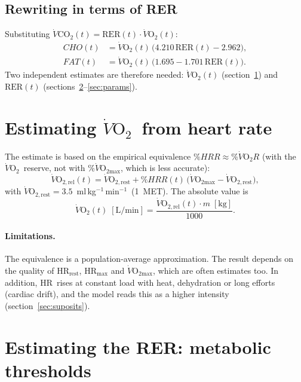 \documentclass[10pt,a4paper]{article}
\newcommand{\VO}{\ensuremath{\dot V\mathrm{O_2}}}
\newcommand{\VCO}{\ensuremath{\dot V\mathrm{CO_2}}}
\newcommand{\VOmax}{\ensuremath{\dot V\mathrm{O_{2max}}}}
\newcommand{\RER}{\ensuremath{\mathrm{RER}}}
\newcommand{\FC}{\ensuremath{\mathrm{HR}}}
\newcommand{\mlkgmin}{ml\,kg$^{-1}$\,min$^{-1}$}
\begin{document}
\subsection{Rewriting in terms of RER}
Substituting $\VCO(t)=\RER(t)\cdot\VO(t)$:
\begin{align}
  CHO(t) &= \VO(t)\,\bigl(4.210\,\RER(t)-2.962\bigr), \label{eq:cho-rer}\\
  FAT(t) &= \VO(t)\,\bigl(1.695-1.701\,\RER(t)\bigr). \label{eq:fat-rer}
\end{align}
Two independent estimates are therefore needed: \VO$(t)$ (section~\ref{sec:vo2}) and
$\RER(t)$ (sections~\ref{sec:rer}--\ref{sec:params}).

\section{Estimating \VO\ from heart rate}\label{sec:vo2}

The estimate is based on the empirical equivalence $\%HRR\approx\%\dot V\mathrm{O_2}R$
\citep{swain1997} (with the \VO\ reserve, not with \%\VOmax, which is less accurate):
\begin{equation}
  \dot V\mathrm{O_{2,rel}}(t)=\dot V\mathrm{O_{2,rest}}
  +\%HRR(t)\,\bigl(\VOmax-\dot V\mathrm{O_{2,rest}}\bigr),
\end{equation}
with $\dot V\mathrm{O_{2,rest}}=3.5$~\mlkgmin\ (1~MET). The absolute value is
\begin{equation}
  \VO(t)\;[\mathrm{L/min}]=\frac{\dot V\mathrm{O_{2,rel}}(t)\cdot m\;[\mathrm{kg}]}{1000}.
\end{equation}

\paragraph{Limitations.} The equivalence is a population-average approximation. The result
depends on the quality of $\FC_{\mathrm{rest}}$, $\FC_{\mathrm{max}}$ and \VOmax, which are
often estimates too. In addition, \FC\ rises at constant load with heat, dehydration or long
efforts (cardiac drift), and the model reads this as a higher intensity
(section~\ref{sec:suposits}).

\section{Estimating the RER: metabolic thresholds}\label{sec:rer}
\end{document}
